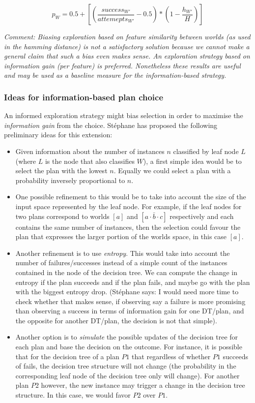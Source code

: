 \documentclass[a4paper]{article}
\newcommand{\dt}{{decision tree}\xspace}
\newcommand{\stephane}{{St\'ephane}\xspace}
\begin{document}
\begin{equation}
\label{eqn:hdist}   
p_W= 0.5 + \left[ \left( \frac{{success_{W'}}}{attemepts_{W'}} - 0.5 \right) *  \left( 1 - \frac{h_{W'}}{H} \right)  \right]
\end{equation}

\textit{Comment: Biasing exploration based on feature similarity between worlds (as used in the hamming distance) is not a satisfactory solution because we cannot make a general claim that such a bias even makes sense. An exploration strategy based on information gain (per feature) is preferred. Nonetheless these results are useful and may be used as a baseline measure for the information-based strategy.}

\subsubsection{Ideas for information-based plan choice}

An informed exploration strategy might bias selection in order to maximise the \textit{information gain} from the choice. \stephane has proposed the following preliminary ideas for this extension:

\begin{itemize}
\item Given information about the number of instances $n$ classified by leaf node $L$ (where $L$ is the node that also classifies $W$), a first simple idea would be to select the plan with the lowest $n$. Equally we could select a plan with a probability inversely proportional to $n$.
\item One possible refinement to this would be to take into account the size of the input space represented by the leaf node. For example, if the leaf nodes for two plans correspond to worlds $[a]$ and $[a \cdot \bar{b} \cdot c]$ respectively and each contains the same number of instances, then the selection could favour the plan that expresses the larger portion of the worlds space, in this case $[a]$.
\item Another refinement is to use \textit{entropy}. This would take into account the number of failures/successes instead of a simple count of the instances contained in the node of the \dt. We can compute the change in entropy if the plan succeeds and if the plan fails, and maybe go with the plan with the biggest entropy drop. (\stephane says: I would need more time to check whether that makes sense, if observing say a failure is more promising than observing a success in terms of information gain for one DT/plan, and the opposite for another DT/plan, the decision is not that simple).
\item Another option is to \textit{simulate} the possible updates of the decision tree for each plan and base the decision on the outcome. For instance, it is possible that for the \dt of a plan $P1$ that regardless of whether $P1$ succeeds of fails, the \dt structure will not change (the probability in the corresponding leaf node of the \dt only will change). For another plan $P2$ however, the new instance may trigger a change in the \dt structure. In this case, we would favor $P2$ over $P1$.
\end{itemize}
\end{document}
